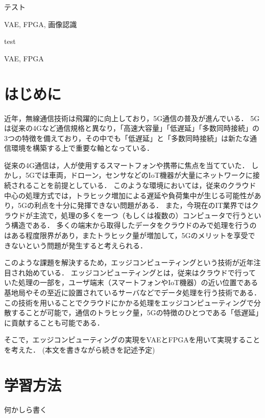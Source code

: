 \documentclass[technicalreport]{ieicej}
\begin{document}
\begin{jabstract}
テスト
\end{jabstract}
\begin{jkeyword}
VAE, FPGA, 画像認識
\end{jkeyword}
\begin{eabstract}
test
\end{eabstract}
\begin{ekeyword}
VAE, FPGA
\end{ekeyword}
\maketitle

\section{はじめに}
近年，無線通信技術は飛躍的に向上しており，5G通信の普及が進んでいる．
5Gは従来の4Gなど通信規格と異なり，「高速大容量」「低遅延」「多数同時接続」の3つの特徴を備えており，その中でも「低遅延」と「多数同時接続」は新たな通信環境を構築する上で重要な軸となっている\cite{5g}．

従来の4G通信は，人が使用するスマートフォンや携帯に焦点を当てていた．
しかし，5Gでは車両，ドローン，センサなどのIoT機器が大量にネットワークに接続されることを前提としている．
このような環境においては，従来のクラウド中心の処理方式では，トラヒック増加による遅延や負荷集中が生じる可能性があり，5Gの利点を十分に発揮できない問題がある．
また，今現在のIT業界ではクラウドが主流で，処理の多くを一つ（もしくは複数の）コンピュータで行うという構造である．
多くの端末から取得したデータをクラウドのみで処理を行うのはある程度限界があり，またトラヒック量が増加して，5Gのメリットを享受できないという問題が発生すると考えられる．

このような課題を解決するため，エッジコンピューティングという技術が近年注目され始めている．
エッジコンピューティングとは，従来はクラウドで行っていた処理の一部を，ユーザ端末（スマートフォンやIoT機器）の近い位置である基地局やその至近に設置されているサーバなどでデータ処理を行う技術である\cite{edge-com}．
この技術を用いることでクラウドにかかる処理をエッジコンピューティングで分散することが可能で，通信のトラヒック量，5Gの特徴のひとつである「低遅延」に貢献することも可能である．

そこで，エッジコンピューティングの実現をVAEとFPGAを用いて実現することを考えた．
(本文を書きながら続きを記述予定)

\section{学習方法}
何かしら書く
\end{document}
